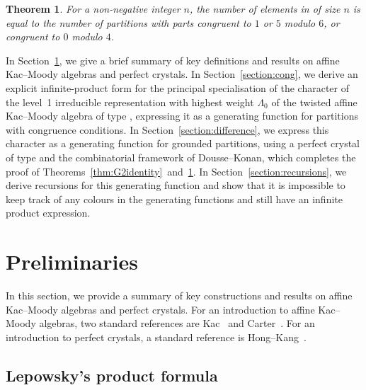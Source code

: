 \documentclass[pdftex]{sigma}
\numberwithin{equation}{section}
\newtheorem{Theorem}{Theorem}[section]
\theoremstyle{definition}
\begin{document}
\begin{Theorem}\label{thm:G2identity_geq}
For a non-negative integer $n$, the number of elements in  of size $n$ is equal to the number of partitions with parts congruent to $1$ or $5$ modulo $6$, or congruent to $0$ modulo $4$.
\end{Theorem}

In Section~\ref{section:preliminaries}, we give a brief summary of key definitions and results on affine Kac--Moody algebras and perfect crystals. In Section~\ref{section:cong}, we derive an explicit infinite-product form for the principal specialisation of the character of the level~1 irreducible representation with highest weight $\Lambda_0$ of the twisted affine Kac--Moody algebra of type , expressing it as a generating function for partitions with congruence conditions. In Section~\ref{section:difference}, we express this character as a generating function for grounded partitions, using a perfect crystal of type  and the combinatorial framework of Dousse--Konan, which completes the proof of Theorems~\ref{thm:G2identity}~and~\ref{thm:G2identity_geq}. In Section~\ref{section:recursions}, we derive recursions for this generating function and show that it is impossible to keep track of any colours in the generating functions and still have an infinite product expression.

\section{Preliminaries} \label{section:preliminaries}

In this section, we provide a summary of key constructions and results on affine Kac--Moody algebras and perfect crystals. For an introduction to affine Kac--Moody algebras, two standard references are Kac~\cite{Kac90} and Carter~\cite{Car10}. For an introduction to perfect crystals, a standard reference is Hong--Kang~\cite[Chapter~10]{HK02}.

\subsection{Lepowsky's product formula}
\end{document}
